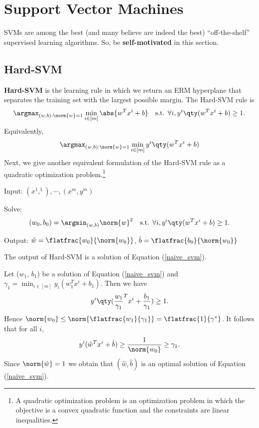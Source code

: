 \section{Support Vector Machines}
SVMs are among the best (and many believe are indeed the best) “off-the-shelf” supervised learning algorithms.
So, be \textbf{self-motivated} in this section.
\subsection{Hard-SVM}
\textbf{Hard-SVM} is the learning rule in which we return an ERM hyperplane that separates the training set with the largest possible margin. The Hard-SVM rule is
\[
	\argmax_{(w,b):\norm{w}=1}\min_{i\in[m]}\abs{w^Tx^i+b}
	\ \ \ 
	\text{s.t. }\forall i, y^i\qty(w^Tx^i+b)\ge 1
.\]
Equivalently,
\begin{equation}
	\argmax_{(w,b):\norm{w}=1}\min_{i\in[m]}y^i\qty(w^Tx^i+b)
	\label{naive_svm}
\end{equation}
Next, we give another equivalent formulation of the Hard-SVM rule as a quadratic optimization problem.\footnote{A quadratic optimization problem is an optimization problem in which the objective is a convex quadratic function and the constraints are linear inequalities.}
\begin{md}
	Input: $(x^1,^1),\cdots,(x^m,y^m)$

	Solve:
	\[
		(w_0,b_0)=\argmin_{(w,b)}\norm{w}^2
		\ \ \ 
		\text{s.t. }\forall i, y^i\qty(w^Tx^i+b)\ge 1
	.\]

	Output: $\hat{w}=\flatfrac{w_0}{\norm{w_0}}$, $\hat{b}=\flatfrac{b_0}{\norm{w_0}}$
\end{md}
\begin{lemma}
	The output of Hard-SVM is a solution of Equation (\ref{naive_svm}).
\end{lemma}
\begin{prf}
	Let ($w_1$, $b_1$) be a solution of Equation (\ref{naive_svm}) and $\gamma_1=\min_{i\in[m]}y_i(w_1^{T}x^i+b_1)$. Then we have
	\[
		y^i\qty(\frac{w_1}{\gamma_1}^Tx^i+\frac{b_1}{\gamma_1})\ge 1
	.\] 
	Hence $\norm{w_0}\le \norm{\flatfrac{w_1}{\gamma_1}}=\flatfrac{1}{\gamma^*}$.
	It follows that for all $i$,
	 \[
		 y^i(\hat{w}^Tx^i+\hat{b})\ge \frac{1}{\norm{w_0}}\ge \gamma_1
	.\] 
	Since $\norm{\hat{w}} = 1$ we obtain that $(\hat{w},\hat{b})$ is an optimal solution of Equation (\ref{naive_svm}).
\end{prf}
